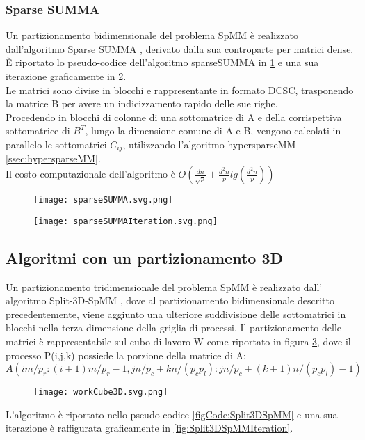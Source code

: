 \subsubsection{Sparse SUMMA}
Un partizionamento bidimensionale del problema SpMM è realizzato
dall'algoritmo Sparse SUMMA \cite{sparseSUMMA}, derivato dalla sua
controparte per matrici dense.\\
È riportato lo pseudo-codice dell'algoritmo sparseSUMMA 
in \ref{figCode:sparseSUMMA} e una sua iterazione graficamente in
\ref{fig:sparseSUMMAIteration}.\\
Le matrici sono divise in blocchi e rappresentante in formato DCSC,
trasponendo la matrice B per avere un indicizzamento rapido delle sue righe.\\
Procedendo in blocchi di colonne di una sottomatrice di A e della corrispettiva
sottomatrice di $B^T$, lungo la dimensione comune di A e B,
vengono calcolati in parallelo le sottomatrici $C_{ij}$, 
utilizzando l'algoritmo hypersparseMM \ref{ssec:hypersparseMM}.\\
Il costo computazionale dell'algoritmo è 
$O(\frac{dn}{\sqrt{p}}+\frac{d^2n}{p}lg(\frac{d^2n}{p}))$
\begin{figure}[h!]
  \caption[SparseSUMMA, per una risoluzione parallela di SpMM con un partizionamento 2D]
  \centering \texttt{[image: sparseSUMMA.svg.png]} \decoRule \label{figCode:sparseSUMMA}
\end{figure}
\begin{figure}[h!]
  \caption[esecuzione di un iterazione dell'algoritmo sparseSUMMA]
  \centering \texttt{[image: sparseSUMMAIteration.svg.png]} \decoRule \label{fig:sparseSUMMAIteration}
\end{figure}

\subsection{Algoritmi con un partizionamento 3D}
Un partizionamento tridimensionale del problema SpMM è realizzato dall'
algoritmo Split-3D-SpMM \cite{Split3DSpMM}, dove al partizionamento
bidimensionale descritto precedentemente, viene aggiunto una ulteriore
suddivisione delle sottomatrici in blocchi nella terza dimensione della griglia di processi.
Il partizionamento delle matrici è rappresentabile sul cubo di lavoro W come
riportato in figura \ref{fig:workCube3D}, dove il processo P(i,j,k) possiede la
porzione della matrice di A: 
$A(im/p_r:(i+1)m/p_r - 1, jn/p_c + kn/(p_c p_l ) : jn/p_c + (k + 1)n/(p_c p_l) - 1)$  \\
\begin{figure}[h!]
  \caption[rappresentazione 3D della suddivisione della computazione SpMM]
  \centering \texttt{[image: workCube3D.svg.png]} \decoRule \label{fig:workCube3D}
\end{figure}
L'algoritmo è riportato nello pseudo-codice \ref{figCode:Split3DSpMM} e una
sua iterazione è raffigurata graficamente in \ref{fig:Split3DSpMMIteration}.\\

